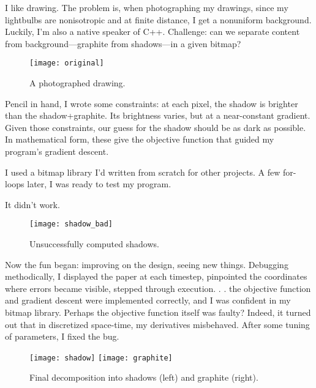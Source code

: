 
I like drawing. The problem is, when photographing my drawings,
since my lightbulbs are nonisotropic and at finite distance, I
get a nonuniform background. Luckily, I'm also a native
speaker of C++. Challenge: can we separate content from background---graphite from shadows---in a given bitmap? 

\begin{figure}[h] \label{fig:original}
   \centering
   \texttt{[image: original]}
   \caption{A photographed drawing.}
\end{figure}

Pencil in hand, I wrote some constraints: at each pixel, the shadow is
brighter than the shadow+graphite. Its brightness varies, but at a
near-constant gradient. Given those constraints, our guess for the
shadow should be as dark as possible. In mathematical form, these give
the objective function that guided my program's gradient descent.

I used a bitmap library I'd written from scratch for other projects.
A few for-loops later, I was ready to test my program.

It didn't work.

\begin{figure}[h] \label{fig:shadowbad}
   \centering
   \texttt{[image: shadow\_bad]}
   \caption{Unsuccessfully computed shadows.}
\end{figure}

\pagebreak


Now the fun began: improving on the design, seeing new things. Debugging
methodically, I displayed the paper at each timestep, pinpointed the
coordinates where errors became visible, stepped through execution. . . 
the objective function and gradient descent were implemented correctly,
and I was confident in my bitmap library. Perhaps the objective function
itself was faulty? Indeed, it turned out that in discretized space-time,
my derivatives misbehaved. After some tuning of parameters, I fixed the bug.

\begin{figure}[h]
   \centering
   \texttt{[image: shadow]} \texttt{[image: graphite]}
   \caption{Final decomposition into shadows (left) and graphite (right).}
\end{figure}
